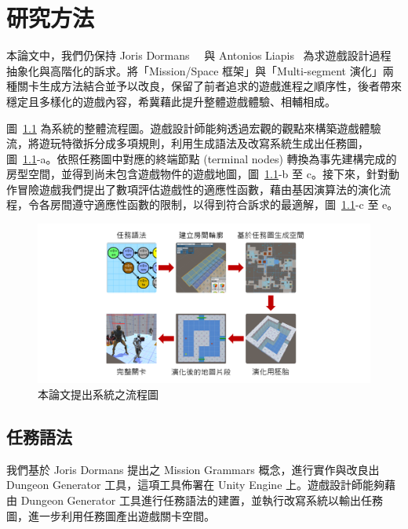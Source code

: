 \chapter{研究方法}
\label{cha:methodology}

本論文中，我們仍保持 Joris Dormans~\cite{dormans2010adventures}~\cite{dormans2012engineering} 與 Antonios Liapis~\cite{liapis2013generating} 為求遊戲設計過程抽象化與高階化的訴求。將「Mission/Space 框架」與「Multi-segment 演化」兩種關卡生成方法結合並予以改良，保留了前者追求的遊戲進程之順序性，後者帶來穩定且多樣化的遊戲內容，希冀藉此提升整體遊戲體驗、相輔相成。

圖~\ref{fig:system-framework} 為系統的整體流程圖。遊戲設計師能夠透過宏觀的觀點來構築遊戲體驗流，將遊玩特徵拆分成多項規則，利用生成語法及改寫系統生成出任務圖，圖~\ref{fig:system-framework}-a。依照任務圖中對應的終端節點 (terminal nodes) 轉換為事先建構完成的房型空間，並得到尚未包含遊戲物件的遊戲地圖，圖~\ref{fig:system-framework}-b 至 c。接下來，針對動作冒險遊戲我們提出了數項評估遊戲性的適應性函數，藉由基因演算法的演化流程，令各房間遵守適應性函數的限制，以得到符合訴求的最適解，圖~\ref{fig:system-framework}-c 至 e。

\begin{figure}[ht]
  \begin{center}
    \includegraphics[width=1.0\textwidth]{figures/系統框架.png}
    \caption{本論文提出系統之流程圖} 
    \label{fig:system-framework}
  \end{center}
\end{figure}

\section{任務語法}
\label{sec:method-missiongrammars}

我們基於 Joris Dormans 提出之 Mission Grammars 概念，進行實作與改良出 Dungeon Generator 工具，這項工具佈署在 Unity Engine 上。遊戲設計師能夠藉由 Dungeon Generator 工具進行任務語法的建置，並執行改寫系統以輸出任務圖，進一步利用任務圖產出遊戲關卡空間。

